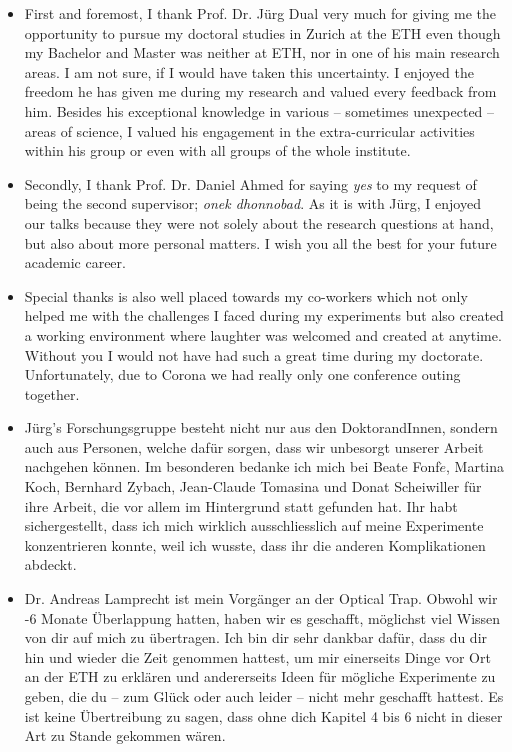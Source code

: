 \begin{itemize}[label=$\succ$]

  \item First and foremost, I thank Prof. Dr. Jürg Dual very much for giving me 
    the opportunity to pursue my doctoral studies in Zurich at the ETH even 
    though my Bachelor and Master was neither at ETH, nor in one of his main 
    research areas. I am not sure, if I would have taken this uncertainty. I 
    enjoyed the freedom he has given me during my research and valued every 
    feedback from him. Besides his exceptional knowledge in various -- 
    sometimes unexpected -- areas of science, I valued his engagement in the 
    extra-curricular activities within his group or even with all groups of the 
    whole institute.

  \item Secondly, I thank Prof. Dr. Daniel Ahmed for saying \emph{yes} to my 
    request of being the second supervisor; \emph{onek dhonnobad}. As it is 
    with Jürg, I enjoyed our talks because they were not solely about the 
    research questions at hand, but also about more personal matters. I wish 
    you all the best for your future academic career.

  \item Special thanks is also well placed towards my co-workers which not only 
  helped me with the challenges I faced during my experiments but also created 
  a working environment where laughter was welcomed and created at anytime. 
  Without you I would not have had such a great time during my doctorate. 
  Unfortunately, due to Corona we had really only one conference outing 
  together.

  \item Jürg's Forschungsgruppe besteht nicht nur aus den DoktorandInnen, 
    sondern auch aus Personen, welche dafür sorgen, dass wir unbesorgt unserer 
    Arbeit nachgehen können. Im besonderen bedanke ich mich bei Beate 
    Fonf$\acute{e}$, Martina Koch, Bernhard Zybach, Jean-Claude Tomasina und 
    Donat Scheiwiller für ihre Arbeit, die vor allem im Hintergrund statt 
    gefunden hat. Ihr habt sichergestellt, dass ich mich wirklich 
    ausschliesslich auf meine Experimente konzentrieren konnte, weil ich 
    wusste, dass ihr die anderen Komplikationen abdeckt.

  \item Dr. Andreas Lamprecht ist mein Vorgänger an der Optical Trap. Obwohl 
    wir -6 Monate Überlappung hatten, haben wir es geschafft, möglichst viel 
    Wissen von dir auf mich zu übertragen. Ich bin dir sehr dankbar dafür, dass 
    du dir hin und wieder die Zeit genommen hattest, um mir einerseits Dinge 
    vor Ort an der ETH zu erklären und andererseits Ideen für mögliche 
    Experimente zu geben, die du -- zum Glück oder auch leider -- nicht mehr 
    geschafft hattest. Es ist keine Übertreibung zu sagen, dass ohne dich 
    Kapitel 4 bis 6 nicht in dieser Art zu Stande gekommen wären.


\end{itemize}
